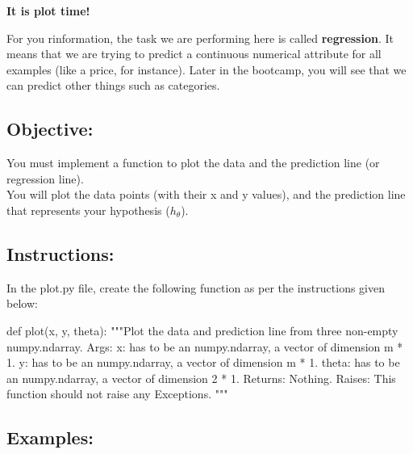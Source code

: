 \documentclass[]{article}
\newenvironment{Shaded}{\begin{snugshade}}{\end{snugshade}}
\newcommand{\CommentTok}[1]{\textcolor[rgb]{0.48,0.49,0.49}{#1}}
\newcommand{\KeywordTok}[1]{\textcolor[rgb]{0.81,0.81,0.76}{#1}}
\newcommand{\NormalTok}[1]{\textcolor[rgb]{0.81,0.81,0.76}{#1}}
\begin{document}
\textbf{It is plot time!}

For you rinformation, the task we are performing here is called
\textbf{regression}. It means that we are trying to predict a continuous
numerical attribute for all examples (like a price, for instance). Later
in the bootcamp, you will see that we can predict other things such as
categories.

\hypertarget{objective-3}{%
\subsection{Objective:}\label{objective-3}}

You must implement a function to plot the data and the prediction line
(or regression line).\\
You will plot the data points (with their x and y values), and the
prediction line that represents your hypothesis (\(h_{\theta}\)).

\hypertarget{instructions-3}{%
\subsection{Instructions:}\label{instructions-3}}

In the plot.py file, create the following function as per the
instructions given below:

\begin{Shaded}
\begin{Highlighting}[]
\KeywordTok{def}\NormalTok{ plot(x, y, theta):}
    \CommentTok{"""Plot the data and prediction line from three non-empty numpy.ndarray.}
\CommentTok{    Args:}
\CommentTok{      x: has to be an numpy.ndarray, a vector of dimension m * 1.}
\CommentTok{      y: has to be an numpy.ndarray, a vector of dimension m * 1.}
\CommentTok{      theta: has to be an numpy.ndarray, a vector of dimension 2 * 1.}
\CommentTok{    Returns:}
\CommentTok{        Nothing.}
\CommentTok{    Raises:}
\CommentTok{      This function should not raise any Exceptions.}
\CommentTok{    """}
\end{Highlighting}
\end{Shaded}

\newpage

\hypertarget{examples-4}{%
\subsection{Examples:}\label{examples-4}}
\end{document}

